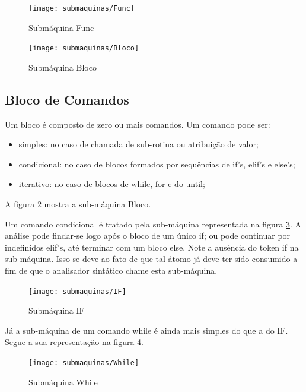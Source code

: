 \documentclass[a4paper,12pt]{report}
\begin{document}
    \begin{figure}[h]
        \caption{Submáquina Func}
        \label{fig:FuncMaq}
        \texttt{[image: submaquinas/Func]}
    \end{figure}

    \begin{figure}[h]
        \caption{Submáquina Bloco}
        \label{fig:BlocoMaq}
        \texttt{[image: submaquinas/Bloco]}
    \end{figure}

    \subsection*{Bloco de Comandos}
    Um bloco é composto de zero ou mais comandos. Um comando pode ser:
    \begin{itemize}
        \item simples: no caso de chamada de sub-rotina ou atribuição de valor;
        \item condicional: no caso de blocos formados por sequências de if's, elif's e else's;
        \item iterativo: no caso de blocos de while, for e do-until;
    \end{itemize}

    A figura \ref{fig:BlocoMaq} mostra a sub-máquina Bloco.

    Um comando condicional é tratado pela sub-máquina representada na figura \ref{fig:IFMaq}.
    A análise pode findar-se logo após o bloco de um único if; ou pode continuar por indefinidos elif's, até terminar com um bloco else. Note a ausência do token if na sub-máquina. Isso se deve ao fato de que tal átomo já deve ter sido consumido a fim de que o analisador sintático chame esta sub-máquina.

    \begin{figure}[h]
        \centering
        \caption{Submáquina IF}    
        \label{fig:IFMaq}
        \texttt{[image: submaquinas/IF]}
    \end{figure}

    Já a sub-máquina de um comando while é ainda mais simples do que a do IF. Segue a sua representação na figura \ref{fig:WhileMaq}.

    \begin{figure}[h]
        \centering
        \caption{Submáquina While}    
        \label{fig:WhileMaq}
        \texttt{[image: submaquinas/While]}
    \end{figure}
\end{document}
